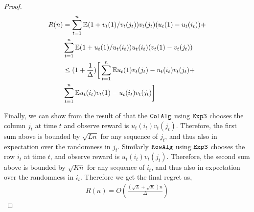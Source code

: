 \begin{proof}
\begin{align*}
R(n)
& = \sum_{t = 1}^n \mathbb{E}{(1 + v_t(1) / v_t(j_t)) v_t(j_t) (u_t(1) - u_t(i_t))} +\\
&\sum_{t = 1}^n \mathbb{E}{(1 + u_t(1) / u_t(i_t)) u_t(i_t) (v_t(1) - v_t(j_t))} \\
& \leq (1 + \frac{1}{\Delta}) \bigg[\sum_{t = 1}^n \mathbb{E}{u_t(1) v_t(j_t) - u_t(i_t) v_t(j_t)} + \\
& \sum_{t = 1}^n \mathbb{E}{u_t(i_t) v_t(1) - u_t(i_t) v_t(j_t)}\bigg]
\end{align*}


Finally, we can show from the result of \citet{auer2002nonstochastic} that the ${\tt ColAlg}$ using ${\tt Exp3}$ chooses the column $j_t$ at time $t$ and observe reward is $u_t(i_t) v_t(j_t)$. Therefore, the first sum above is bounded by $\sqrt{L n}$ for any sequence of $j_t$, and thus also in expectation over the randomness in $j_t$. Similarly ${\tt RowAlg}$ using ${\tt Exp3}$ chooses the row $i_t$ at time $t$, and observe reward is $u_t(i_t) v_t(j_t)$. Therefore, the second sum above is bounded by $\sqrt{K n}$ for any sequence of $i_t$, and thus also in expectation over the randomness in $i_t$. Therefore we get the final regret as,
\begin{align*}
  R(n) = O\left(\frac{\left(\sqrt{L } + \sqrt{K }\right)n}{\Delta}\right)
\end{align*}
\end{proof}


